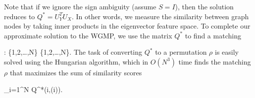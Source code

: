 \documentclass[journal]{IEEEtran}
\newenvironment{myalign}{\par\nobreak\noindent\align}{\endalign}
\begin{document}
Note that if we ignore the sign ambiguity (assume $S = I$), then the solution
reduces to $Q^* = U_Y^T U_X$. In other words, we measure the similarity between
graph nodes by taking inner products in the eigenvector feature space.  To
complete our approximate solution to the WGMP, we use the matrix $Q^*$ to find a
matching
\begin{myalign}
  \rho: \{1,2,\ldots,N\} \to \{1,2,\ldots,N\}.
\end{myalign}
The task of converting $Q^*$ to a permutation $\rho$ is easily solved using the
Hungarian algorithm, which in $O(N^3)$ time finds the matching $\rho$ that
maximizes the sum of similarity scores
\begin{myalign}
  \sum_{i=1}^N Q^*(i,\rho(i)).
\end{myalign}



\end{document}
